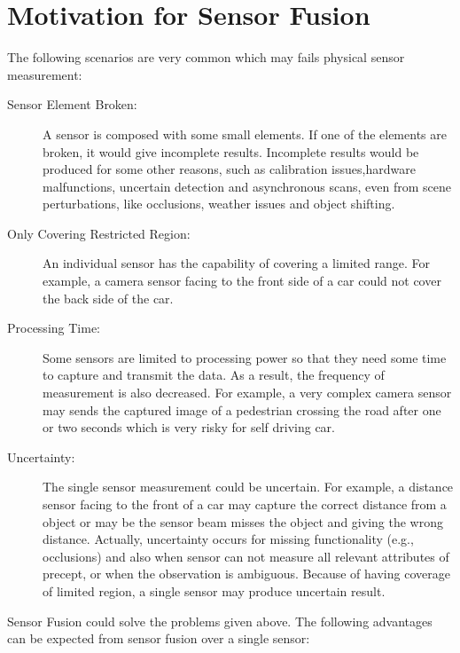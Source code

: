 \section{Motivation for Sensor Fusion}
The following scenarios are very common which may fails physical sensor measurement\cite{Wilfried2002}:
\begin{description}
    \item[Sensor Element Broken:] A sensor is composed with some small elements. If one of the elements are broken, it would give incomplete results. Incomplete results would be produced for some other reasons, such as calibration issues,hardware malfunctions, uncertain detection and asynchronous scans, even from scene perturbations, like occlusions, weather issues and object shifting.
    \item[Only Covering Restricted Region:] An individual sensor has the capability of covering a limited range. For example, a camera sensor facing to the front side of a car could not cover the back side of the car.
    \item[Processing Time:] Some sensors are limited to processing power so that they need some time to capture and transmit the data. As a result, the frequency of measurement is also decreased. For example, a very complex camera sensor may sends the captured image of a pedestrian crossing the road after one or two seconds which is very risky for self driving car.
    \item[Uncertainty:] The single sensor measurement could be uncertain. For example, a distance sensor facing to the front of a car may capture the correct distance from a object or may be the sensor beam misses the object and giving the wrong distance. Actually, uncertainty occurs for missing functionality (e.g., occlusions) and also when sensor can not measure all relevant attributes of precept, or when the observation is ambiguous\cite{Wilfried2002}. Because of having coverage of limited region, a single sensor may produce uncertain result\cite{Wilfried2002}.
\end{description}
Sensor Fusion could solve the problems given above. The following advantages can be expected from sensor fusion over a single sensor\cite{Wilfried2002}:
